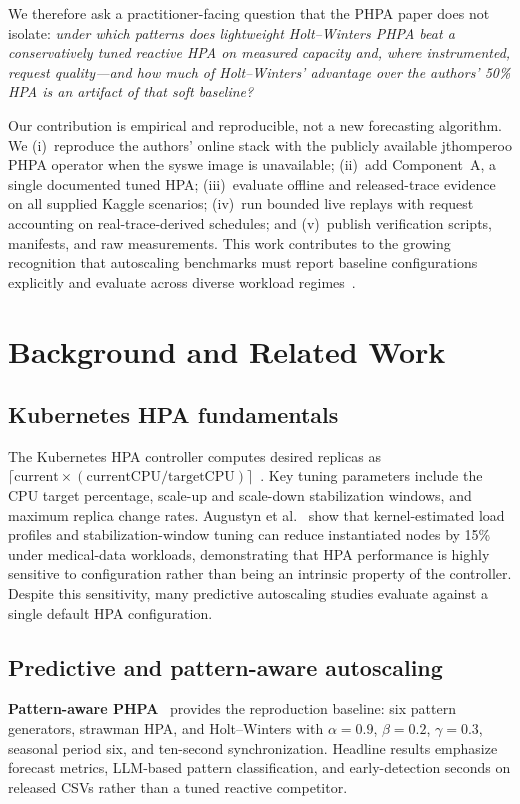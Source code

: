 \documentclass[journal]{IEEEtran}
\begin{document}
We therefore ask a practitioner-facing question that the PHPA paper does not isolate: \emph{under which patterns does lightweight Holt--Winters PHPA beat a conservatively tuned reactive HPA on measured capacity and, where instrumented, request quality---and how much of Holt--Winters' advantage over the authors' 50\% HPA is an artifact of that soft baseline?}

Our contribution is empirical and reproducible, not a new forecasting algorithm. We (i)~reproduce the authors' online stack with the publicly available jthomperoo PHPA operator when the syswe image is unavailable; (ii)~add Component~A, a single documented tuned HPA; (iii)~evaluate offline and released-trace evidence on all supplied Kaggle scenarios; (iv)~run bounded live replays with request accounting on real-trace-derived schedules; and (v)~publish verification scripts, manifests, and raw measurements. This work contributes to the growing recognition that autoscaling benchmarks must report baseline configurations explicitly and evaluate across diverse workload regimes~\cite{mca2026, schroder2023}.

\section{Background and Related Work}

\subsection{Kubernetes HPA fundamentals}
The Kubernetes HPA controller computes desired replicas as $\lceil \text{current} \times (\text{currentCPU}/\text{targetCPU}) \rceil$~\cite{nguyen2020}. Key tuning parameters include the CPU target percentage, scale-up and scale-down stabilization windows, and maximum replica change rates. Augustyn et al.~\cite{augustyn2024} show that kernel-estimated load profiles and stabilization-window tuning can reduce instantiated nodes by 15\% under medical-data workloads, demonstrating that HPA performance is highly sensitive to configuration rather than being an intrinsic property of the controller. Despite this sensitivity, many predictive autoscaling studies evaluate against a single default HPA configuration.

\subsection{Predictive and pattern-aware autoscaling}
\textbf{Pattern-aware PHPA}~\cite{duman2026} provides the reproduction baseline: six pattern generators, strawman HPA, and Holt--Winters with $\alpha{=}0.9$, $\beta{=}0.2$, $\gamma{=}0.3$, seasonal period six, and ten-second synchronization. Headline results emphasize forecast metrics, LLM-based pattern classification, and early-detection seconds on released CSVs rather than a tuned reactive competitor.
\end{document}
